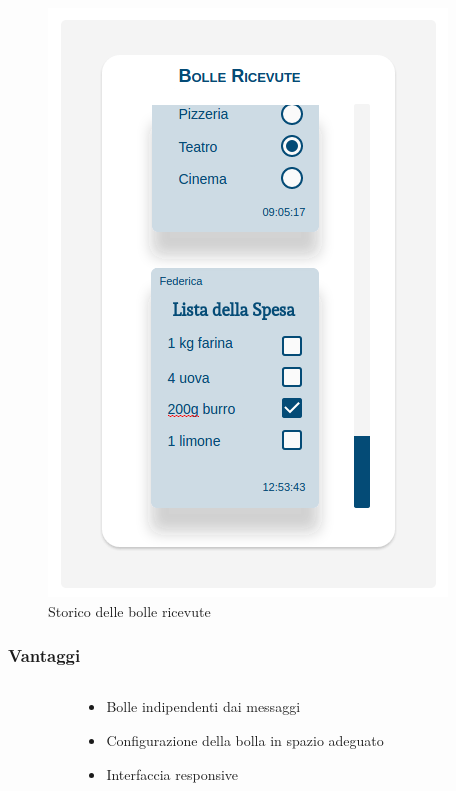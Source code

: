 \begin{frame}
	\begin{figure}
		\begin{center}
			\caption{Storico delle bolle ricevute}
			\includegraphics[scale=0.35]{img/mockup_4.png}
		\end{center}
	\end{figure}	
\end{frame}

\begin{frame}
\frametitle{Vantaggi}	
	\begin{columns}
		\begin{column}{0.2\textwidth}
			
		\end{column}
		
		\begin{column}{0.4\textwidth}
			\begin{itemize}
				\item Bolle indipendenti dai messaggi
				\item Configurazione della bolla in spazio adeguato
				\item Interfaccia responsive
			\end{itemize}
		\end{column}
		
		\begin{column}{0.2\textwidth}
			
		\end{column}
	\end{columns}
	
\end{frame}
